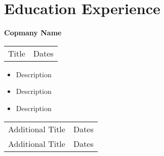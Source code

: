 \section{\sc Education Experience}
{\bf{Copmany Name}}\\
\begin{tabular}{@{}p{4in}p{2in}}
Title & Dates\\
\end{tabular}
\begin{itemize}
\setlength\itemsep{0em}
\item Description
\item Description
\item Description
\end{itemize}
\begin{tabular}{@{}p{4in}p{2in}}
Additional Title & Dates\\
Additional Title & Dates\\
\end{tabular}
\endinput